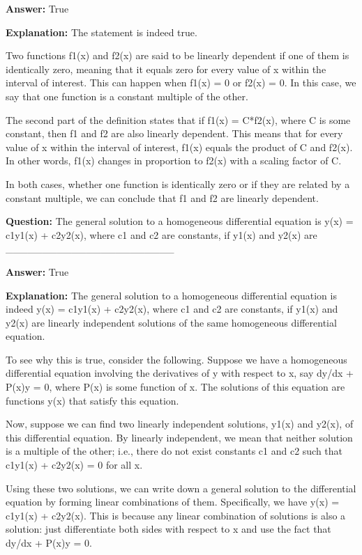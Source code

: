 \documentclass{article}
\begin{document}
                \textbf{Answer:} True

                \textbf{Explanation:} The statement is indeed true.

Two functions f1(x) and f2(x) are said to be linearly dependent if one of them is identically zero, meaning that it equals zero for every value of x within the interval of interest. This can happen when f1(x) = 0 or f2(x) = 0. In this case, we say that one function is a constant multiple of the other.

The second part of the definition states that if f1(x) = C*f2(x), where C is some constant, then f1 and f2 are also linearly dependent. This means that for every value of x within the interval of interest, f1(x) equals the product of C and f2(x). In other words, f1(x) changes in proportion to f2(x) with a scaling factor of C.

In both cases, whether one function is identically zero or if they are related by a constant multiple, we can conclude that f1 and f2 are linearly dependent.
                
                \vspace{0.5cm} 
        
            
                \textbf {Question:} The general solution to a homogeneous differential equation is y(x) = c1y1(x) + c2y2(x), where c1 and c2 are constants, if y1(x) and y2(x) are \_\_\_\_\_\_\_\_\_\_\_\_\_\_\_\_\_\_\_\_\_\_\_
                
                \textbf{Answer:} True

                \textbf{Explanation:} The general solution to a homogeneous differential equation is indeed y(x) = c1y1(x) + c2y2(x), where c1 and c2 are constants, if y1(x) and y2(x) are linearly independent solutions of the same homogeneous differential equation.

To see why this is true, consider the following. Suppose we have a homogeneous differential equation involving the derivatives of y with respect to x, say dy/dx + P(x)y = 0, where P(x) is some function of x. The solutions of this equation are functions y(x) that satisfy this equation.

Now, suppose we can find two linearly independent solutions, y1(x) and y2(x), of this differential equation. By linearly independent, we mean that neither solution is a multiple of the other; i.e., there do not exist constants c1 and c2 such that c1y1(x) + c2y2(x) = 0 for all x.

Using these two solutions, we can write down a general solution to the differential equation by forming linear combinations of them. Specifically, we have y(x) = c1y1(x) + c2y2(x). This is because any linear combination of solutions is also a solution: just differentiate both sides with respect to x and use the fact that dy/dx + P(x)y = 0.
\end{document}
